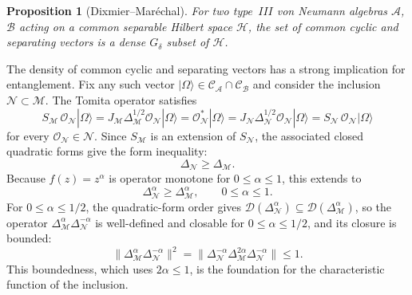 \documentclass[a4paper,11pt]{article}
\newtheorem{proposition}[theorem]{Proposition}
\theoremstyle{definition}
\begin{document}
\begin{proposition}[Dixmier--Mar\'echal]\label{prop:dense-common}
For two type~$III$ von Neumann algebras $\mathcal{A}$, $\mathcal{B}$ acting on a common
separable Hilbert space $\mathcal{H}$, the set of common cyclic and separating vectors
is a dense $G_\delta$ subset of $\mathcal{H}$.
\end{proposition}

\noindent The density of common cyclic and separating vectors has a strong implication for
entanglement.  Fix any such vector $|\Omega\rangle\in\mathcal{C}_\mathcal{A}\cap\mathcal{C}_\mathcal{B}$
and consider the inclusion $\mathcal{N}\subset\mathcal{M}$.  The Tomita operator satisfies
\begin{equation}
  S_\mathcal{M}\,\mathcal{O}_\mathcal{N}|\Omega\rangle
  = J_\mathcal{M}\Delta_\mathcal{M}^{1/2}\mathcal{O}_\mathcal{N}|\Omega\rangle
  = \mathcal{O}_\mathcal{N}^*|\Omega\rangle
  = J_\mathcal{N}\Delta_\mathcal{N}^{1/2}\mathcal{O}_\mathcal{N}|\Omega\rangle
  = S_\mathcal{N}\,\mathcal{O}_\mathcal{N}|\Omega\rangle
  \label{eq:Tomita-extension}
\end{equation}
for every $\mathcal{O}_\mathcal{N}\in\mathcal{N}$.  Since $S_\mathcal{M}$ is an extension
of $S_\mathcal{N}$, the associated closed quadratic forms give the form inequality:
\begin{equation}
  \Delta_\mathcal{N} \geq \Delta_\mathcal{M}.
  \label{eq:modular-inequality}
\end{equation}
Because $f(z)=z^\alpha$ is operator monotone for $0\leq\alpha\leq 1$, this extends to
\begin{equation}
  \Delta_\mathcal{N}^\alpha \geq \Delta_\mathcal{M}^\alpha, \qquad 0\leq\alpha\leq 1.
  \label{eq:modular-inequality-alpha}
\end{equation}
For $0\leq\alpha\leq1/2$, the quadratic-form order gives $\mathcal{D}(\Delta_\mathcal{N}^\alpha)\subseteq\mathcal{D}(\Delta_\mathcal{M}^\alpha)$,
so the operator $\Delta_\mathcal{M}^\alpha\Delta_\mathcal{N}^{-\alpha}$ is well-defined
and closable for $0\leq\alpha\leq 1/2$, and its closure is bounded:
\begin{equation}
  \|\Delta_\mathcal{M}^\alpha\Delta_\mathcal{N}^{-\alpha}\|^2
  = \|\Delta_\mathcal{N}^{-\alpha}\Delta_\mathcal{M}^{2\alpha}\Delta_\mathcal{N}^{-\alpha}\|
  \leq 1.
  \label{eq:characteristic-bounded}
\end{equation}
This boundedness, which uses $2\alpha\leq 1$, is the foundation for the characteristic
function of the inclusion.
\end{document}
